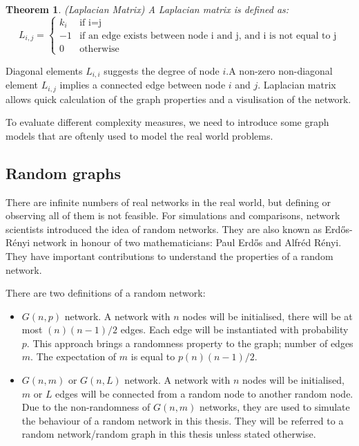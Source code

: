 \documentclass[12pt]{article}
\newtheorem{theorem}{Theorem}[section]
\begin{document}
\begin{theorem}{(Laplacian Matrix)}
    A Laplacian matrix is defined as:
    \begin{equation}
        L_{i,j} = \begin{cases}
            k_{i}& \text{if i=j}\\
            -1 & \text{if an edge exists between node i and j, and i is not equal to j}\\
            0 & \text{otherwise}
        \end{cases}
    \end{equation}
\end{theorem}
\par
Diagonal elements $L_{i,i}$ suggests the degree of node $i$.A non-zero non-diagonal element $L_{i,j}$ implies a connected edge between node $i$ and $j$. Laplacian matrix allows quick calculation of the graph properties and a visulisation of the network.

\par
To evaluate different complexity measures, we need to introduce some graph models that are oftenly used to model the real world problems.
\subsection{Random graphs}
There are infinite numbers of real networks in the real world, but defining or observing all of them is not feasible. For simulations and comparisons, network scientists introduced the idea of random networks. They are also known as Erd\H{o}s-R\'{e}nyi network in honour of two mathematicians: Paul Erd\H{o}s and Alfr\'{e}d R\'{e}nyi. They have important contributions to understand the properties of a random network\cite{renyi1959random}.\\
\par
There are two definitions of a random network:
\begin{itemize}
    \item $G(n,p)$ network. A network with $n$ nodes will be initialised, there will be at most $(n)(n-1)/2$ edges. Each edge will be instantiated with probability $p$. This approach brings a randomness property to the graph; number of edges $m$. The expectation of $m$ is equal to $p(n)(n-1)/2$.
    \item $G(n,m)$ or $G(n,L)$ network. A network with $n$ nodes will be initialised, $m$ or $L$ edges will be connected from a random node to another random node. Due to the non-randomness of $G(n,m)$ networks, they are used to simulate the behaviour of a random network in this thesis. They will be referred to a random network/random graph in this thesis unless stated otherwise.
\end{itemize}
\end{document}
